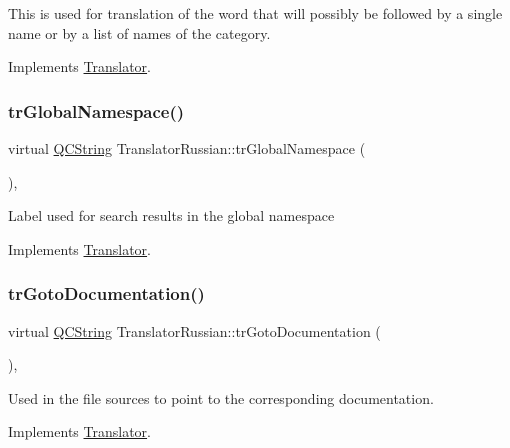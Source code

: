 This is used for translation of the word that will possibly be followed by a single name or by a list of names of the category. 

Implements \mbox{\hyperlink{class_translator}{Translator}}.

\mbox{\label{class_translator_russian_af4a7d9f601c42e8df7b2ae2ff7727b1f}} 
\subsubsection{\texorpdfstring{trGlobalNamespace()}{trGlobalNamespace()}}
{\footnotesize\ttfamily virtual \mbox{\hyperlink{class_q_c_string}{Q\+C\+String}} Translator\+Russian\+::tr\+Global\+Namespace (\begin{DoxyParamCaption}{ }\end{DoxyParamCaption})\hspace{0.3cm}{\ttfamily [inline]}, {\ttfamily [virtual]}}

Label used for search results in the global namespace 

Implements \mbox{\hyperlink{class_translator}{Translator}}.

\mbox{\label{class_translator_russian_aeb093d82db9695fb9db051e7c8dc7519}} 
\subsubsection{\texorpdfstring{trGotoDocumentation()}{trGotoDocumentation()}}
{\footnotesize\ttfamily virtual \mbox{\hyperlink{class_q_c_string}{Q\+C\+String}} Translator\+Russian\+::tr\+Goto\+Documentation (\begin{DoxyParamCaption}{ }\end{DoxyParamCaption})\hspace{0.3cm}{\ttfamily [inline]}, {\ttfamily [virtual]}}

Used in the file sources to point to the corresponding documentation. 

Implements \mbox{\hyperlink{class_translator}{Translator}}.

\mbox{\label{class_translator_russian_a4078ccd04741bf184fb299437d9f05fd}} 
